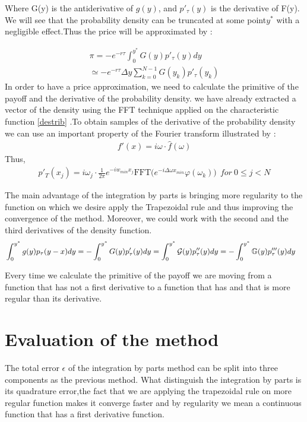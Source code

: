 \documentclass[12pt]{report}
\begin{document}
Where G(y) is the antiderivative of $g(y)$, and $p'_{\tau}(y)$ is the derivative of F(y).
We will see that the probability density can be truncated at some point$y^*$ with a negligible effect.Thus the price will be approximated by :

\begin{gather}
\pi=-e^{-r\tau}\int_{0}^{y^*} G(y) p'_{\tau}(y)  dy \nonumber \\
\simeq -e^{-r\tau} \Delta y \sum_{k=0}^{N-1}G(y_k) p'_{\tau}(y_k)
\label{N-point}
\end{gather} 
In order to have a price approximation, we need to calculate the primitive of the payoff and the derivative of the probability density. we have already extracted a vector of the density using the FFT technique applied on the characteristic function \eqref{destrib} .To obtain samples of the derivative of the probability density we can use an important property of the Fourier transform illustrated by :
\begin{gather*}
f'(x)= i \omega \cdot \hat{f}(\omega)
\end{gather*}
Thus, 
\begin{gather}
p'_T(x_j)= i \omega_j \cdot   \frac{1}{2 \pi} e^{- iw_{min} x_j} \text{FFT}\big ( e^{-i \Delta\omega x_{min} } \varphi(\omega_k) \big) ~~for~ 0 \leqslant j < N
\end{gather}

The main advantage of the integration by parts is bringing more regularity to the function on which we desire apply the Trapezoidal rule and thus improving the convergence of the method. Moreover, we could work with the second and the third derivatives of the density function.
\begin{align*}
&\int_{0}^{y^*}g(y)p_{\tau}(y-x)dy = -
\int_{0}^{y^*} G(y) p'_{\tau}(y)  dy
=\int_{0}^{y^*} {\cal{G}}(y) p''_{\tau}(y)dy
=-\int_{0}^{y^*} {\mathbb{G}}(y) p'''_{\tau}(y)dy
\end{align*}   

Every time we calculate the primitive of the payoff we are moving from a function that has not a  first derivative to a function that has and that is more regular than its derivative. 

\section{Evaluation of the method }

The total error $\epsilon$ of the integration by parts method can be split into three components as the previous method. What distinguish the integration by parts is its quadrature error,the fact that we are applying the trapezoidal rule on more regular function makes it converge faster and by regularity we mean a continuous function that has a first derivative function.
\end{document}
